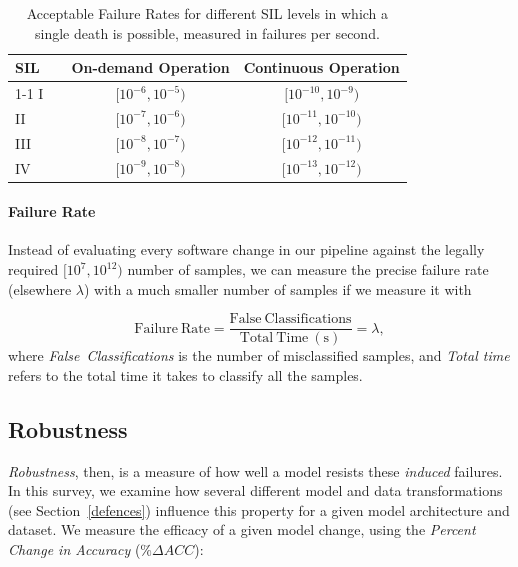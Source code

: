 \begin{table}[!ht]
    \begin{center}
        \caption{Acceptable Failure Rates for different SIL levels in which a single death is possible, measured in failures per second.}
        \begin{tabular}{l c cc}
            \toprule
            SIL  && On-demand Operation   & Continuous Operation \\
            \cmidrule{1-1} \cmidrule{3-4}
            I     && $[10^{-6}, 10^{-5})$  & $[10^{-10}, 10^{-9})$ \\
            II    && $[10^{-7}, 10^{-6})$  & $[10^{-11}, 10^{-10})$ \\
            III   && $[10^{-8}, 10^{-7})$  & $[10^{-12}, 10^{-11})$ \\
            IV    && $[10^{-9}, 10^{-8})$  & $[10^{-13}, 10^{-12})$ \\
            \bottomrule
        \end{tabular}
        \label{tab:rate}
    \end{center}
\end{table}


\paragraph{Failure Rate}

Instead of evaluating every software change in our pipeline against the legally required $[10^7,10^{12})$ number of samples, we can measure the precise failure rate (elsewhere $\lambda$) with a much smaller number of samples if we measure it with



\begin{equation}\label{eq:failure_rate}
    \mathrm{Failure~Rate} = \frac{\mathrm{False~Classifications}}{\mathrm{Total ~Time~(s)}}
                          = \lambda,
\end{equation}
where \textit{False~Classifications} is the number of misclassified samples, and \textit{Total time} refers to the total time it takes to classify all the samples.


\subsection{Robustness}
\textit{Robustness}, then, is a measure of how well a model resists these \textit{induced} failures.
In this survey, we examine how several different model and data transformations (see Section~\ref{defences}) influence this property for a given model architecture and dataset.
We measure the efficacy of a given model change, using the \textit{Percent Change in Accuracy} ($\%\Delta ACC$):

